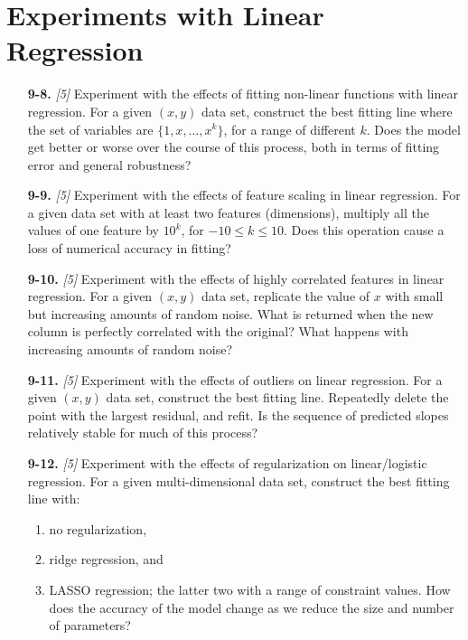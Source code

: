 \documentclass[10pt]{article}
\begin{document}
\section*{Experiments with Linear Regression}
\begin{enumerate}
    \item [{\bf 9-8.}] \emph{[5]} Experiment with the effects of fitting non-linear functions with linear regression. For a given $(x, y)$ data set, construct the best fitting line where the set of variables are $\{1, x, \ldots, x^k\}$, for a range of different $k$. Does the model get better or worse over the course of this process, both in terms of fitting error and general robustness?
    \item [{\bf 9-9.}] \emph{[5]} Experiment with the effects of feature scaling in linear regression. For a given data set with at least two features (dimensions), multiply all the values of one feature by $10^k$, for $-10 \leq k \leq 10$. Does this operation cause a loss of numerical accuracy in fitting?
    \item [{\bf 9-10.}] \emph{[5]} Experiment with the effects of highly correlated features in linear regression. For a given $(x, y)$ data set, replicate the value of $x$ with small but increasing amounts of random noise. What is returned when the new column is perfectly correlated with the original? What happens with increasing amounts of random noise?
    \item [{\bf 9-11.}] \emph{[5]} Experiment with the effects of outliers on linear regression. For a given $(x, y)$ data set, construct the best fitting line. Repeatedly delete the point with the largest residual, and refit. Is the sequence of predicted slopes relatively stable for much of this process?
    \item [{\bf 9-12.}] \emph{[5]} Experiment with the effects of regularization on linear/logistic regression. For a given multi-dimensional data set, construct the best fitting line with:
    \begin{enumerate}
        \item no regularization,
        \item ridge regression, and 
        \item LASSO regression; the latter two with a range of constraint values. How does the accuracy of the model change as we reduce the size and number of parameters?
    \end{enumerate}
\end{enumerate}
\end{document}
